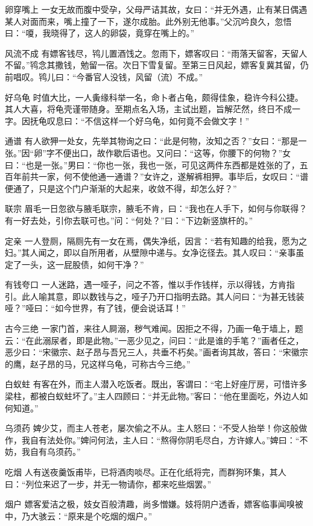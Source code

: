 \documentclass[12pt,UTF8]{ctexbook}
\begin{document}
卵穿嘴上
一女无故而腹中受孕，父母严诘其故，女曰：“并无外遇，止有某日偶遇某人对面而来，嘴上撞了一下，遂尔成胎。此外别无他事。”父沉吟良久，忽悟曰：“嗄，我晓得了，这人的卵袋，竟穿在嘴上的。”

风流不成
有嫖客钱尽，鸨儿置酒饯之。忽雨下，嫖客叹曰：“雨落天留客，天留人不留。”鸨念其撒钱，勉留一宿。次日下雪复留。至第三日风起，嫖客复冀其留，仍前唱叹。鸨儿曰：“今番官人没钱，风留（流）不成。”

好乌龟
时值大比，一人夤缘科举一名，命卜者占龟，颇得佳象，稳许今科公捷。其人大喜，将龟壳谨带随身。至期点名入场，主试出题，旨解茫然，终日不成一字。因抚龟叹息曰：“不信这样一个好乌龟，如何竟不会做文字！”

通谱
有人欲狎一处女，先举其物询之曰：“此是何物，汝知之否？”女曰：“那是一张。”因“卵”字不便出口，故作歇后语也。又问曰：“这等，你腰下的何物？”女曰：“也是一张。”男曰：“你也一张，我也一张，可见这两件东西都是姓张的了，五百年前共一家，何不使他通一通谱？”女许之，遂解裤相狎。事毕后，女叹曰：“谱便通了，只是这个门户渐渐的大起来，收敛不得，却怎么好？”

联宗
眉毛一日忽欲与腋毛联宗，腋毛不肯，曰：“我也在人手下，如何与你联得？有一好去处，引你去联可也。”问：“何处？”曰：“下边新竖旗杆的。”

定亲
一人登厕，隔厕先有一女在焉，偶失净纸，因言：“若有知趣的给我，愿为之妇。”其人闻之，即以自所用者，从壁隙中递与。女净讫径去。其人叹曰：“亲事虽定了一头，这一屁股债，如何干净？”

有钱夸口
一人迷路，遇一哑子，问之不答，惟以手作钱样，示以得钱，方肯指引。此人喻其意，即以数钱与之，哑子乃开口指明去路。其人问曰：“为甚无钱装哑？”哑曰：“如今世界，有了钱，便会说话耳！”

古今三绝
一家门首，来往人屙溺，秽气难闻。因拒之不得，乃画一龟于墙上，题云：“在此溺尿者，即是此物。”一恶少见之，问曰：“此是谁的手笔？”画者任之，恶少曰：“宋徽宗、赵子昂与吾兄三人，共垂不朽矣。”画者询其故，答曰：“宋徽宗的鹰，赵子昂的马，兄这样乌龟，可称古今三绝。”

白蚁蛀
有客在外，而主人潜入吃饭者。既出，客谓曰：“宅上好座厅房，可惜许多梁柱，都被白蚁蛀坏了。”主人四顾曰：“并无此物。”客曰：“他在里面吃，外边人如何知道。”

乌须药
婢少艾，而主人苍老，屡次偷之不从。主人怒曰：“不受人抬举！你这般做作，我自有法处你。”婢问何法，主人曰：“熬得你阴毛尽白，方许嫁人。”婢曰：“不妨，我自有乌须药。”

吃烟
人有送夜羹饭甫毕，已将酒肉啖尽。正在化纸将完，而群狗环集，其人曰：“列位来迟了一步，并无一物请你，都来吃些烟罢。”

烟户
嫖客爱洁之极，妓女百般清趣，尚多憎嫌。妓将阴户透香，嫖客临事闻嗅被中，乃大骇云：“原来是个吃烟的烟户。”
\end{document}
